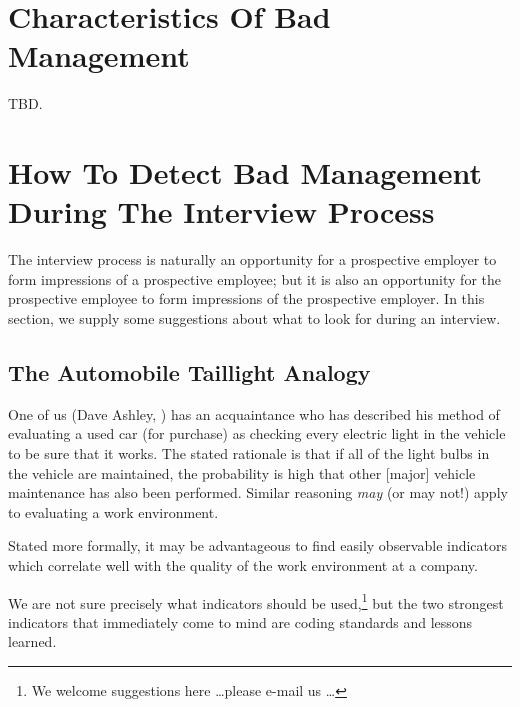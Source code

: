
\section{Characteristics Of Bad Management}

TBD.



\section{How To Detect Bad Management During The Interview Process}

The interview process is naturally an opportunity for a prospective
employer to form impressions of a prospective employee; but it is
also an opportunity for the prospective employee to form impressions
of the prospective employer.  In this section, we supply some suggestions
about what to look for during an interview.

\subsection{The Automobile Taillight Analogy}

One of us (Dave Ashley, \cite{bibref:i:daveashley})
has an acquaintance who has described his method of evaluating
a used car (for purchase) as checking every electric light in the
vehicle to be sure that it works.  The stated rationale is that if
all of the light bulbs in the vehicle are maintained, the probability
is high that other [major] vehicle maintenance has also been performed.
Similar reasoning \emph{may} (or may not!) apply to evaluating
a work environment.

Stated more formally, it may be advantageous to find easily observable
indicators which correlate well with the quality of the work environment
at a company.

We are not sure precisely what indicators should be used,\footnote{We welcome
suggestions here \ldots please e-mail us \ldots{}} but the two 
strongest indicators that immediately come to mind are coding standards
and lessons learned.


